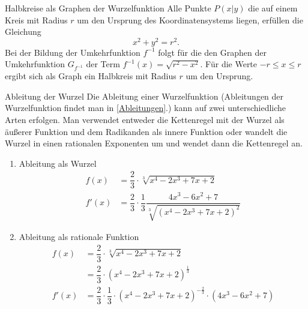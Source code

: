  \begin{merke}{Halbkreise als Graphen der Wurzelfunktion}{}
Alle Punkte $P(x|y)$ die auf einem Kreis mit Radius $r$ um den Ursprung des Koordinatensystems liegen, erfüllen die Gleichung $$x^2+y^2 = r^2.$$ Bei der Bildung der Umkehrfunktion $f^{-1}$ folgt für die den Graphen der Umkehrfunktion $G_{f^{-1}}$ der Term $f^{-1}(x) = \sqrt{r^2-x^2}$. Für die Werte $-r\leq x\leq r$ ergibt sich als Graph ein Halbkreis mit Radius $r$ um den Ursprung.
 \begin{center}
\end{center}
 \end{merke}
 
 \begin{b8d}{Ableitung der Wurzel}{}
Die Ableitung einer Wurzelfunktion (Ableitungen der Wurzelfunktion findet man in \ref{Ableitungen}.) kann auf zwei unterschiedliche Arten erfolgen. Man verwendet entweder die Kettenregel mit der Wurzel als äußerer Funktion und dem Radikanden als innere Funktion oder wandelt die Wurzel in einen rationalen Exponenten um und wendet dann die Kettenregel an.
\begin{enumerate}
    \item Ableitung als Wurzel
    \begin{equation*}
        \begin{split}
            f(x) &= \dfrac{2}{3} \cdot \sqrt[3]{x^4-2x^3 +7x+2}\\
            f'(x) &= \dfrac{2}{3} \cdot \dfrac{1}{3} \dfrac{4x^3-6x^2+7}{\sqrt[3]{(x^4-2x^3 +7x+2)^2}} 
        \end{split}
    \end{equation*}
    \item Ableitung als rationale Funktion
    \begin{equation*}
        \begin{split}
            f(x) &= \dfrac{2}{3} \cdot \sqrt[3]{x^4-2x^3 +7x+2}\\
            &= \dfrac{2}{3} \cdot (x^4-2x^3+7x+2)^{\frac{1}{3}}\\
            f'(x) &= \dfrac{2}{3} \cdot \dfrac{1}{3} \cdot (x^4-2x^3+7x+2)^{-\frac{2}{3}} \cdot (4x^3-6x^2+7)
        \end{split}
    \end{equation*}
\end{enumerate}
 \end{b8d}
